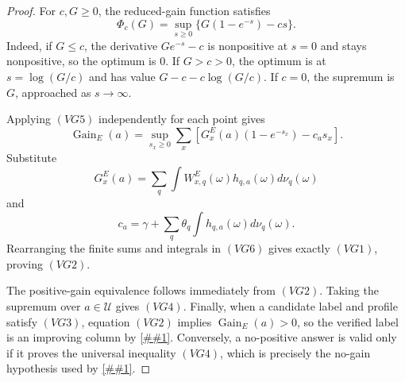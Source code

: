 \documentclass[10pt]{article}
\newcommand{\cref}[1]{\ref{##1}}
\theoremstyle{definition}
\begin{document}
\begin{proof}
   For \(c,G\ge0\), the reduced-gain function satisfies
   \[
      \Phi_c(G)=\sup_{s\ge0}\{G(1-e^{-s})-cs\}.
      \tag{VG5}
   \]
   Indeed, if \(G\le c\), the derivative \(Ge^{-s}-c\) is nonpositive at
   \(s=0\) and stays nonpositive, so the optimum is \(0\).  If \(G>c>0\), the
   optimum is at \(s=\log(G/c)\) and has value
   \(G-c-c\log(G/c)\).  If \(c=0\), the supremum is \(G\), approached as
   \(s\to\infty\).

   Applying \((VG5)\) independently for each point gives
   \[
      \operatorname{Gain}_E(a)
      =
      \sup_{s_x\ge0}
      \sum_x
      \left[
         G_x^E(a)(1-e^{-s_x})-c_a s_x
      \right].
      \tag{VG6}
   \]
   Substitute
   \[
      G_x^E(a)=
      \sum_q\int W^E_{x,q}(\omega)h_{q,a}(\omega)d\nu_q(\omega)
   \]
   and
   \[
      c_a=\gamma+\sum_q\theta_q\int h_{q,a}(\omega)d\nu_q(\omega).
   \]
   Rearranging the finite sums and integrals in \((VG6)\) gives exactly
   \((VG1)\), proving \((VG2)\).

   The positive-gain equivalence follows immediately from \((VG2)\).  Taking
   the supremum over \(a\in\mathcal U\) gives \((VG4)\).  Finally, when a
   candidate label and profile satisfy \((VG3)\), equation \((VG2)\) implies
   \(\operatorname{Gain}_E(a)>0\), so the verified label is an improving column
   by \cref{cor:whole-bucket-reduced-gain}.  Conversely, a no-positive answer
   is valid only if it proves the universal inequality \((VG4)\), which is
   precisely the no-gain hypothesis used by
   \cref{lem:implicit-reduced-gain-separation}.
\end{proof}
\end{document}
